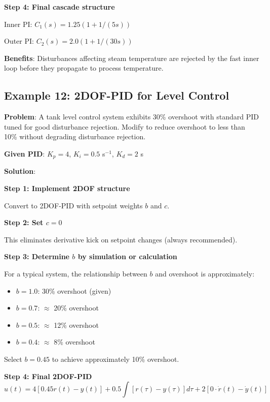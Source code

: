 \textbf{Step 4: Final cascade structure}

Inner PI: $C_1(s) = 1.25(1 + 1/(5s))$

Outer PI: $C_2(s) = 2.0(1 + 1/(30s))$

\textbf{Benefits}: Disturbances affecting steam temperature are rejected by the fast inner loop before they propagate to process temperature.

\subsection{Example 12: 2DOF-PID for Level Control}
\label{subsec:ex_2dof_level}

\textbf{Problem}: A tank level control system exhibits 30\% overshoot with standard PID tuned for good disturbance rejection. Modify to reduce overshoot to less than 10\% without degrading disturbance rejection.

\textbf{Given PID}: $K_p = 4$, $K_i = 0.5$ s$^{-1}$, $K_d = 2$ s

\textbf{Solution}:

\textbf{Step 1: Implement 2DOF structure}

Convert to 2DOF-PID with setpoint weights $b$ and $c$.

\textbf{Step 2: Set $c = 0$}

This eliminates derivative kick on setpoint changes (always recommended).

\textbf{Step 3: Determine $b$ by simulation or calculation}

For a typical system, the relationship between $b$ and overshoot is approximately:

\begin{itemize}
    \item $b = 1.0$: 30\% overshoot (given)
    \item $b = 0.7$: $\approx$ 20\% overshoot
    \item $b = 0.5$: $\approx$ 12\% overshoot
    \item $b = 0.4$: $\approx$ 8\% overshoot
\end{itemize}

Select $b = 0.45$ to achieve approximately 10\% overshoot.

\textbf{Step 4: Final 2DOF-PID}
\begin{equation}
u(t) = 4[0.45r(t) - y(t)] + 0.5\int[r(\tau) - y(\tau)]d\tau + 2[0 \cdot \dot{r}(t) - \dot{y}(t)]
\end{equation}

